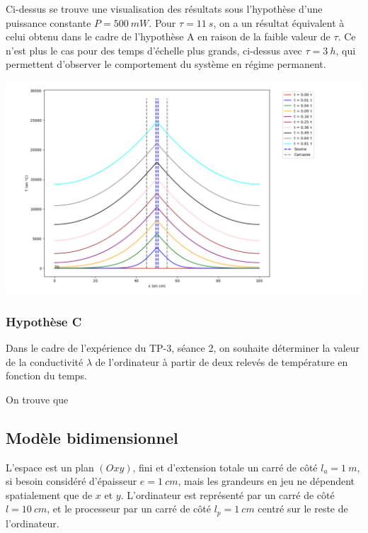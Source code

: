 \documentclass{article}
\begin{document}
Ci-dessus se trouve une visualisation des résultats sous l'hypothèse d'une puissance constante $P = \SI{500}{mW}$. Pour $\tau = \SI{11}{s}$, on a un résultat équivalent à celui obtenu dans le cadre de l'hypothèse A en raison de la faible valeur de $\tau$. Ce n'est plus le cas pour des temps d'échelle plus grands, ci-dessus avec $\tau = \SI{3}{h}$, qui permettent d'observer le comportement du système en régime permanent.

\includegraphics[scale=0.37]{1dB_P500mW_t11000s.png}

\subsubsection{Hypothèse C}

Dans le cadre de l'expérience du TP-3, séance 2, on souhaite déterminer la valeur de la conductivité $\lambda$ de l'ordinateur à partir de deux relevés de température en fonction du temps.

On trouve que



\subsection{Modèle bidimensionnel}

L'espace est un plan $(Oxy)$, fini et d'extension totale un carré de côté $l_a = \SI{1}{m}$, si besoin considéré d'épaisseur $e = \SI{1}{cm}$, mais les grandeurs en jeu ne dépendent spatialement que de $x$ et $y$. L'ordinateur est représenté par un carré de côté $l = \SI{10}{cm}$, et le processeur par un carré de côté $l_p = \SI{1}{cm}$ centré sur le reste de l'ordinateur.

\end{document}
